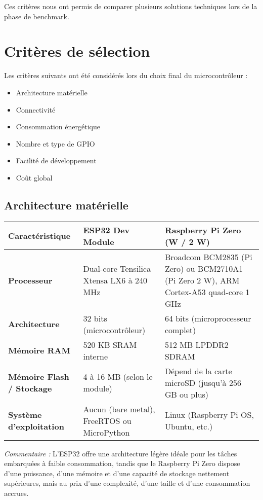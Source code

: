 \documentclass{param}
\begin{document}
\medskip
Ces critères nous ont permis de comparer plusieurs solutions techniques lors de la phase de benchmark.
\vspace{20px}

\section{Critères de sélection}
Les critères suivants ont été considérés lors du choix final du microcontrôleur :
\begin{itemize}
    \item Architecture matérielle
    \item Connectivité
    \item Consommation énergétique
    \item Nombre et type de GPIO
    \item Facilité de développement
    \item Coût global
\end{itemize}

\subsection{Architecture matérielle}
\begin{center}
\renewcommand{\arraystretch}{1.3}
\begin{tabularx}{0.95\textwidth}{|>{\bfseries}l|X|X|}
\hline
\textbf{Caractéristique} & \textbf{ESP32 Dev Module} & \textbf{Raspberry Pi Zero (W / 2 W)} \\
\hline
Processeur & Dual-core Tensilica Xtensa LX6 à 240 MHz & Broadcom BCM2835 (Pi Zero) ou BCM2710A1 (Pi Zero 2 W), ARM Cortex-A53 quad-core 1 GHz \\
\hline
Architecture & 32 bits (microcontrôleur) & 64 bits (microprocesseur complet) \\
\hline
Mémoire RAM & 520 KB SRAM interne & 512 MB LPDDR2 SDRAM \\
\hline
Mémoire Flash / Stockage & 4 à 16 MB (selon le module) & Dépend de la carte microSD (jusqu’à 256 GB ou plus) \\
\hline
Système d’exploitation & Aucun (bare metal), FreeRTOS ou MicroPython & Linux (Raspberry Pi OS, Ubuntu, etc.) \\
\hline
\end{tabularx}
\end{center}

\noindent\textit{Commentaire :}  
L’ESP32 offre une architecture légère idéale pour les tâches embarquées à faible consommation, tandis que le Raspberry Pi Zero dispose d’une puissance, d’une mémoire et d’une capacité de stockage nettement supérieures, mais au prix d’une complexité, d’une taille et d’une consommation accrues.
\end{document}
